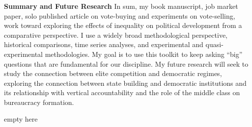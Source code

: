 \documentclass[11pt]{letter} %
\begin{document}
\begin{letter}{}
{\bf Summary and Future Research} In sum, my book manuscript, job market paper, solo published article on vote-buying and experiments on vote-selling, work toward exploring the effects of inequality on political development from a comparative perspective. I use a widely broad methodological perspective, historical comparisons, time series analyses, and experimental and quasi-experimental methodologies. My goal is to use this toolkit to keep asking ``big'' questions that are fundamental for our discipline. My future research will seek to study the connection between elite competition and democratic regimes, exploring the connection between state building and democratic institutions and its relationship with vertical accountability and the role of the middle class on bureaucracy formation.

\closing{{\color{white}empty here}}




\end{letter}
\end{document}
